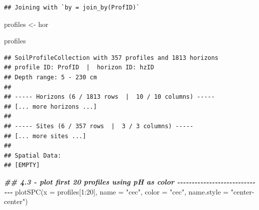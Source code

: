 \documentclass[
  10pt,
  b5paper,
  oneside]{book}
\newenvironment{Shaded}{\begin{snugshade}}{\end{snugshade}}
\newcommand{\AttributeTok}[1]{\textcolor[rgb]{0.77,0.63,0.00}{#1}}
\newcommand{\DecValTok}[1]{\textcolor[rgb]{0.00,0.00,0.81}{#1}}
\newcommand{\DocumentationTok}[1]{\textcolor[rgb]{0.56,0.35,0.01}{\textbf{\textit{#1}}}}
\newcommand{\FunctionTok}[1]{\textcolor[rgb]{0.00,0.00,0.00}{#1}}
\newcommand{\NormalTok}[1]{#1}
\newcommand{\OtherTok}[1]{\textcolor[rgb]{0.56,0.35,0.01}{#1}}
\newcommand{\SpecialCharTok}[1]{\textcolor[rgb]{0.00,0.00,0.00}{#1}}
\newcommand{\StringTok}[1]{\textcolor[rgb]{0.31,0.60,0.02}{#1}}
\begin{document}
\begin{Shaded}
\end{Shaded}

\begin{verbatim}
## Joining with `by = join_by(ProfID)`
\end{verbatim}

\begin{Shaded}
\begin{Highlighting}[]
\NormalTok{profiles }\OtherTok{\textless{}{-}}\NormalTok{ hor}

\NormalTok{profiles}
\end{Highlighting}
\end{Shaded}

\begin{verbatim}
## SoilProfileCollection with 357 profiles and 1813 horizons
## profile ID: ProfID  |  horizon ID: hzID 
## Depth range: 5 - 230 cm
## 
## ----- Horizons (6 / 1813 rows  |  10 / 10 columns) -----
## [... more horizons ...]
## 
## ----- Sites (6 / 357 rows  |  3 / 3 columns) -----
## [... more sites ...]
## 
## Spatial Data:
## [EMPTY]
\end{verbatim}

\begin{Shaded}
\begin{Highlighting}[]
\DocumentationTok{\#\# 4.3 {-} plot first 20 profiles using pH as color {-}{-}{-}{-}{-}{-}{-}{-}{-}{-}{-}{-}{-}{-}{-}{-}{-}{-}{-}{-}{-}{-}{-}{-}{-}{-}{-}{-}{-}{-}}
\FunctionTok{plotSPC}\NormalTok{(}\AttributeTok{x =}\NormalTok{ profiles[}\DecValTok{1}\SpecialCharTok{:}\DecValTok{20}\NormalTok{], }\AttributeTok{name =} \StringTok{"cec"}\NormalTok{, }\AttributeTok{color =} \StringTok{"cec"}\NormalTok{,}
        \AttributeTok{name.style =} \StringTok{"center{-}center"}\NormalTok{)}
\end{Highlighting}
\end{Shaded}
\end{document}
